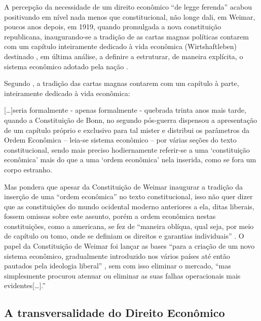 \documentclass[
	10pt,				%
	openright,			%
	twoside,			%
	a5paper,			%
	english,			%
	french,				%
	spanish,			%
	brazil				%
	]{abntex2}
\renewenvironment{quote}
  {\small\list{}{\rightmargin=0.1cm \leftmargin=4cm}%
   \item\relax}
  {\endlist}
\begin{document}
\begin{quote}
A percepção da necessidade de um direito econômico ``de legge ferenda''
acabou positivando em nível nada menos que constitucional, não longe
dali, em Weimar, poucos anos depois, em 1919, quando promulgada a nova
constituição republicana, inaugurando-se a tradição de as cartas magnas
políticas contarem com um capítulo inteiramente dedicado à vida
econômica (Wirtshaftleben) destinado , em última análise, a definire a
estruturar, de maneira explícita, o sistema econômico adotado pela nação
\cite[p.~20]{Nusdeo}.
\end{quote}

Segundo , a tradição das cartas magnas
contarem com um capítulo à parte, inteiramente dedicado à vida
econômica:

\begin{quote}
{[}\ldots{}{]}seria formalmente - apenas formalmente - quebrada trinta
anos mais tarde, quando a Constituição de Bonn, no segundo pós-guerra
dispensou a apresentação de um capítulo próprio e exclusivo para tal
mister e distribui os parâmetros da Ordem Econômica -- leia-se sistema
econômico -- por várias seções do texto constitucional, sendo mais
preciso hodiernamente referir-se a uma `constituição econômica' mais do
que a uma `ordem econômica' nela inserida, como se fora um corpo
estranho.
\end{quote}

Mas  pondera que apesar da Constituição de
Weimar inaugurar a tradição da inserção de uma ``ordem econômica'' no
texto constitucional, isso não quer dizer que as constituições do mundo
ocidental moderno anteriores a ela, ditas liberais, fossem omissas sobre
este assunto, porém a ordem econômica nestas constituições, como a
americana, se fez de ``maneira oblíqua, qual seja, por meio de capítulo
ou tomo, onde se definiam os direitos e garantias individuais''
\cite[p.~22]{Nusdeo}. O papel da Constituição de Weimar foi lançar as
bases ``para a criação de um novo sistema econômico, gradualmente
introduzido nos vários países até então pautados pela ideologia
liberal'' \cite[p.~23]{Nusdeo}, sem com isso eliminar o mercado, ``mas
simplesmente procurou atenuar ou eliminar as suas falhas operacionais
mais evidentes{[}\ldots{}{]}.''

\subsection{A transversalidade do Direito
Econômico}\label{a-transversalidade-do-direito-econuxf4mico}
\end{document}

